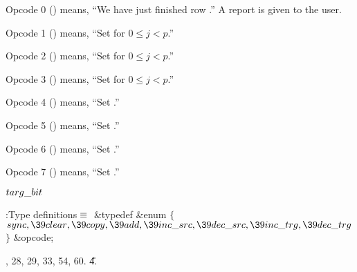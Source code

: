 Opcode 0 () means, ``We have just finished row .'' A
report
is given to the user.

Opcode 1 () means, ``Set  for $0%
\le j< p$.''

Opcode 2 () means, ``Set  for $0\le j<p$.''

Opcode 3 () means, ``Set  for $0\le j<p$.''

Opcode 4 () means, ``Set .''

Opcode 5 () means, ``Set .''

Opcode 6 () means, ``Set .''

Opcode 7 () means, ``Set .''

\Y\B\4\D$\\{targ\_bit}$ \5
\par
\Y\B\4:Type definitions\X${}\equiv{}$\6
\&{typedef} \&{enum} ${}\{{}$\1\6
${}\\{sync},\39\\{clear},\39\\{copy},\39\\{add},\39\\{inc\_src},\39\\{dec%
\_src},\39\\{inc\_trg},\39\\{dec\_trg}{}$\2\6
${}\}{}$ \&{opcode};\par
{}, 28, 29, 33, 54, 60.
\U4.\fi

